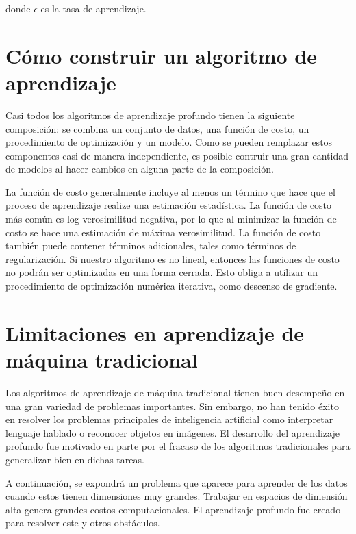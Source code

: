 donde $\epsilon$ es la tasa de aprendizaje.
\cite{goodfellow-et-al-2016}

\section{Cómo construir un algoritmo de aprendizaje}
Casi todos los algoritmos de aprendizaje profundo tienen la siguiente composición: se combina un conjunto de datos, una función de costo, un procedimiento de optimización y un modelo. Como se pueden remplazar estos componentes casi de manera independiente, es posible contruir una gran cantidad de modelos al hacer cambios en alguna parte de la composición.

\vspace{1em}

La función de costo generalmente incluye al menos un término que hace que el proceso de aprendizaje realize una estimación estadística. La función de costo más común es log-verosimilitud negativa, por lo que al minimizar la función de costo se hace una estimación de máxima verosimilitud. La función de costo también puede contener términos adicionales, tales como términos de regularización. Si nuestro algoritmo es no lineal, entonces las funciones de costo no podrán ser optimizadas en una forma cerrada. Esto obliga a utilizar un procedimiento de optimización numérica iterativa, como descenso de gradiente. 
\cite{goodfellow-et-al-2016}

\section{Limitaciones en aprendizaje de máquina tradicional}
Los algoritmos de aprendizaje de máquina tradicional tienen buen desempeño en una gran variedad de problemas importantes. Sin embargo, no han tenido éxito en resolver los problemas principales de inteligencia artificial como interpretar lenguaje hablado o reconocer objetos en imágenes. El desarrollo del aprendizaje profundo fue motivado en parte por el fracaso de los algoritmos tradicionales para generalizar bien en dichas tareas.

\vspace{1em}

A continuación, se expondrá un problema que aparece para aprender de los datos cuando estos tienen dimensiones muy grandes. Trabajar en espacios de dimensión alta genera grandes costos computacionales. El aprendizaje profundo fue creado para resolver este y otros obstáculos.
\cite{goodfellow-et-al-2016}

